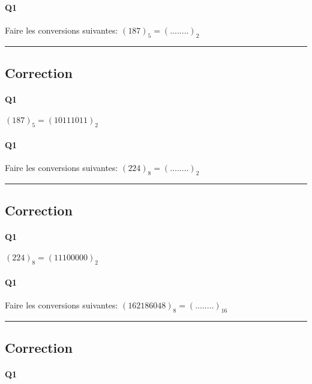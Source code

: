 \pagebreak

\paragraph{Q1}

Faire les conversions suivantes: 
$(187)_{5} = (........)_{2}$

\hrule width 1\linewidth
\pagebreak

\subsection{Correction}


\paragraph{Q1}

$(187)_{5} = (10111011)_{2}$
\pagebreak

\paragraph{Q1}

Faire les conversions suivantes: 
$(224)_{8} = (........)_{2}$

\hrule width 1\linewidth
\pagebreak

\subsection{Correction}


\paragraph{Q1}

$(224)_{8} = (11100000)_{2}$
\pagebreak

\paragraph{Q1}

Faire les conversions suivantes: 
$(162186048)_{8} = (........)_{16}$

\hrule width 1\linewidth
\pagebreak

\subsection{Correction}


\paragraph{Q1}

